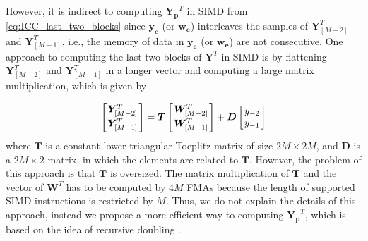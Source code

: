 However, it is indirect to computing $\bm{Y_p}^T$ in SIMD from \eqref{eq:ICC_last_two_blocks} 
since $\bm{y_e}$ (or $\bm{w_e}$) interleaves the samples of $\bm{Y}^T_{[M-2]}$ and $\bm{Y}^T_{[M-1]}$,
i.e., the memory of data in $\bm{y_e}$ (or $\bm{w_e}$) are not consecutive. 
One approach to computing the last two blocks of $\bm{Y}^T$ in SIMD 
is by flattening $\bm{Y}^T_{[M-2]}$ and $\bm{Y}^T_{[M-1]}$
in a longer vector and computing a large matrix multiplication, which is given by


\begin{equation*}
    \begin{aligned}
        \left[\arraycolsep=1.0pt\def\arraystretch{1.0}
                \begin{array}{c}
                \bm{Y}^T_{[M-2]} \\ [0.5ex] \hdashline 
                \bm{Y}^T_{[M-1]} \\ 
                \end{array}\right] = \bm{T} \left[\arraycolsep=1.0pt\def\arraystretch{1.0}
                \begin{array}{c}
                \bm{W}^T_{[M-2]} \\ [0.5ex] \hdashline
                \bm{W}^T_{[M-1]} \\ 
                \end{array}\right] + \bm{D} \left[\arraycolsep=1.0pt\def\arraystretch{1.0}
                \begin{array}{c}
                y_{-2} \\  
                y_{-1} \\ 
                \end{array}\right] \\
    \end{aligned}
\end{equation*}
where $\bm{T}$ is a constant lower triangular Toeplitz matrix of size $2M {\times}2M$,
and $\bm{D}$ is a $2M {\times} 2$ matrix, in which the elements are related to $\bm{T}$.
However, the problem of this approach is that $\bm{T}$ is oversized.
The matrix multiplication of $\bm{T}$ and the vector of $\bm{W}^T$
has to be computed by $4M$ FMAs because the length of
supported SIMD instructions is restricted by $M$. Thus, we do not explain the details of this approach,
instead we propose a more efficient way to computing 
$\bm{Y_p}^T$, which is based on the idea of recursive doubling \cite{Kogge_73}.













